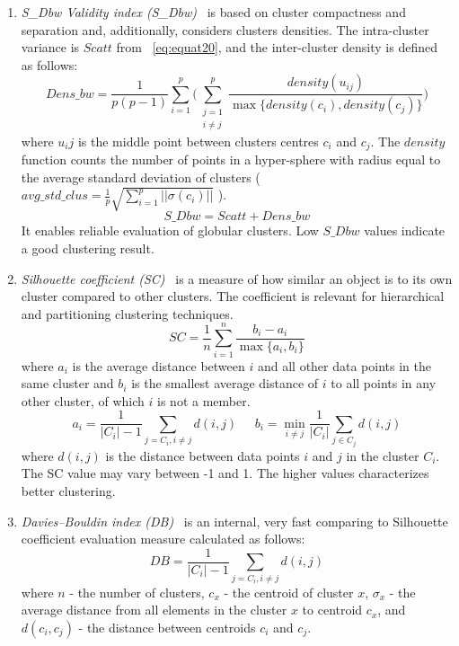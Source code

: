 \begin{enumerate}
  \item \textit{S\_Dbw Validity index (S\_Dbw)}~\cite{halkidi2001S_Dbw} is based on cluster compactness and separation and, additionally, considers clusters densities. The intra-cluster variance is $Scatt$ from ~\autoref{eq:equat20}, and the inter-cluster density is defined as follows:
      \begin{equation}
        Dens\_bw=\frac{1}{p(p-1)}\sum_{i=1}^p \Big(\sum_{\substack{j=1 \\ i \neq j}}^p \frac{density(u_{ij})}{\max\{density(c_i),density(c_j)\}}\Big)
    \label{eq:equat22}
    \end{equation}
  where $u_ij$ is the middle point between clusters centres $c_i$ and $c_j$. The $density$ function counts the number of points in a hyper-sphere with radius equal to the average standard deviation of clusters ($avg\_std\_clus = \frac{1}{p}\sqrt{\sum_{i=1}^p||\sigma(c_i)||}$ ).
    \begin{equation}
        S\_Dbw=Scatt+Dens\_bw
    \label{eq:equat23}
    \end{equation}  
  It enables reliable evaluation of globular clusters. Low $S\_Dbw$ values indicate a good clustering result. 
  
  \item \textit{Silhouette coefficient (SC)}~\cite{zhu2010clustering} is a measure of how similar an object is to its own cluster compared to other clusters. The coefficient is relevant for hierarchical and partitioning clustering techniques.
    \begin{equation}
    SC = \frac{1}{n}\sum_{i=1}^n \frac{b_i - a_i}{\max\{a_i, b_i\}}
    \label{eq:equat24}
    \end{equation}
  where $a_i$ is the average distance between $i$ and all other data points in the same cluster and $b_i$ is the smallest average distance of $i$ to all points in any other cluster, of which $i$ is not a member.
      \begin{equation}
        a_i = \frac{1}{|C_i|-1}\sum_{j=C_i,i\neq j} d(i,j)\;\;\;\;\; 
        b_i = \min_{i\neq j} \frac{1}{|C_i|}\sum_{j\in C_j} d(i,j)
        \label{eq:equat20}
      \end{equation}
  where $d(i,j)$ is the distance between data points $i$ and $j$ in the cluster $C_{i}$. The SC value may vary between -1 and 1. The higher values characterizes better clustering.
  
  \item \textit{Davies–Bouldin index (DB)}~\cite{davies1979cluster} is an internal, very fast comparing to Silhouette coefficient evaluation measure calculated as follows:
    \begin{equation}
        DB = \frac{1}{|C_i|-1}\sum_{j=C_i,i\neq j} d(i,j)
        \label{eq:equat21}
     \end{equation}
  where $n$ - the number of clusters, $c_{x}$ - the centroid of cluster $x$, $\sigma _{x}$ - the average distance from all elements in the cluster $x$ to centroid $c_{x}$, and $d(c_{i},c_{j})$ - the distance between centroids $c_{i}$ and $c_{j}$.
  

\end{enumerate}
